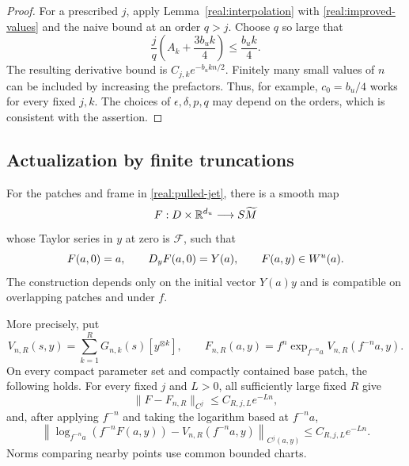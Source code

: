 \begin{proof}
For a prescribed $j$, apply Lemma~\ref{real:interpolation} with
\eqref{real:improved-values} and the naive bound at an order $q>j$.
Choose $q$ so large that
\[
 \frac{j}{q}\left(A_k+\frac{3b_uk}{4}\right)
           \le\frac{b_uk}{4}.
\]
The resulting derivative bound is $C_{j,k}e^{-b_ukn/2}$.
Finitely many small values of $n$ can be included by increasing the
prefactors. Thus, for example, $c_0=b_u/4$ works for every fixed
$j,k$. The choices of $\epsilon,\delta,p,q$ may depend on the
orders, which is consistent with the assertion.
\end{proof}

\subsection{Actualization by finite truncations}

\begin{proposition}\label{real:actualization}
For the patches and frame in \eqref{real:pulled-jet}, there is a
smooth map
\[
 F:D\times\mathbb R^{d_u}\longrightarrow S\widetilde M
\]
whose Taylor series in $y$ at zero is $\mathcal F$, such that
\[
 F(a,0)=a,\qquad D_yF(a,0)=Y(a),\qquad F(a,y)\in W^u(a).
\]
The construction depends only on the initial vector $Y(a)y$ and
is compatible on overlapping patches and under $f$.

More precisely, put
\[
 V_{n,R}(s,y)=\sum_{k=1}^R G_{n,k}(s)[y^{\otimes k}],
 \qquad
 F_{n,R}(a,y)=f^n\exp_{f^{-n}a}V_{n,R}(f^{-n}a,y).
\]
On every compact parameter set and compactly contained base patch,
the following holds. For every fixed $j$ and $L>0$, all sufficiently
large fixed $R$ give
\begin{equation}\label{real:fast-approximation}
 \|F-F_{n,R}\|_{C^j}\le C_{R,j,L}e^{-Ln},
\end{equation}
and, after applying $f^{-n}$ and taking the logarithm based at
$f^{-n}a$,
\begin{equation}\label{real:fast-backward}
 \left\|\log_{f^{-n}a}(f^{-n}F(a,y))
       -V_{n,R}(f^{-n}a,y)\right\|_{C^j(a,y)}
       \le C_{R,j,L}e^{-Ln}.
\end{equation}
Norms comparing nearby points use common bounded charts.
\end{proposition}

